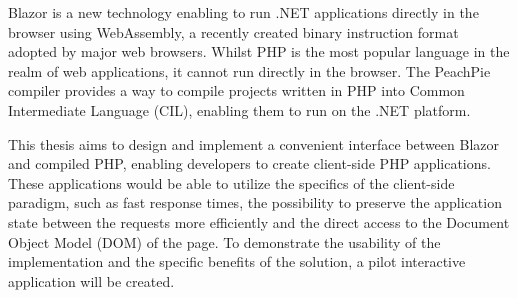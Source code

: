 \documentclass[12pt]{report}
\begin{document}

Blazor is a new technology enabling to run .NET applications directly in the browser using WebAssembly, a recently created binary instruction format adopted by major web browsers.
Whilst PHP is the most popular language in the realm of web applications, it cannot run directly in the browser.
The PeachPie compiler provides a way to compile projects written in PHP into Common Intermediate Language (CIL), enabling them to run on the .NET platform.

This thesis aims to design and implement a convenient interface between Blazor and compiled PHP, enabling developers to create client-side PHP applications.
These applications would be able to utilize the specifics of the client-side paradigm, such as fast response times, the possibility to preserve the application state between the requests more efficiently and the direct access to the Document Object Model (DOM) of the page.
To demonstrate the usability of the implementation and the specific benefits of the solution, a pilot interactive application will be created.
\end{document}
